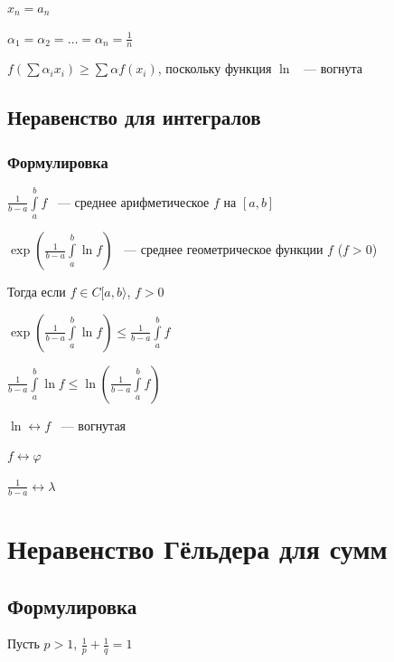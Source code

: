 \documentclass{article}
\begin{document}
                $x_n = a_n$
                
                $\alpha_1 = \alpha_2 = \ldots = \alpha_n = \frac{1}{n}$
                
                $f(\sum \alpha_i x_i) \geq \sum \alpha f(x_i)$, поскольку функция $\ln$ ~--- вогнута
                
        \subsection{Неравенство для интегралов}
        
            \subsubsection{Формулировка}
                $\frac{1}{b - a} \int\limits^b_a f$ ~--- среднее арифметическое $f$ на $[a, b]$
            
                $\exp\left(\frac{1}{b - a} \int\limits^b_a \ln f \right)$ ~--- среднее геометрическое функции $f$ ($f > 0$)
            
                Тогда если $f \in C[a, b \rangle$, $f > 0$
                
                $\exp\left(\frac{1}{b - a} \int\limits^b_a \ln f \right) \leq \frac{1}{b - a} \int\limits^b_a f$
                
                $\frac{1}{b - a} \int\limits^b_a \ln f \leq \ln \left( \frac{1}{b - a} \int\limits^b_a f \right)$
                
                $\ln \longleftrightarrow f$ ~--- вогнутая
                
                $f \longleftrightarrow \varphi$
                
                $\frac{1}{b - a} \longleftrightarrow \lambda$
                
    \newpage
    
    \section{Неравенство Гёльдера для сумм}
    
        \subsection{Формулировка}
        
            Пусть $p > 1$, $\frac{1}{p} + \frac{1}{q} = 1$
            
\end{document}
